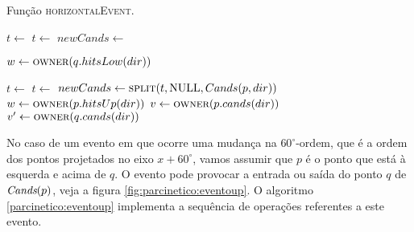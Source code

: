 \begin{algorithm}[h]
    \caption{Função \textsc{horizontalEvent}.}
    \label{parcinetico:eventohorizontal}
\begin{algorithmic}[1]
            \State $t \leftarrow$ 
                \State $t \leftarrow$ 
            \EndIf
            \State $newCands \leftarrow$ 
            \State {}
            \State {}
                \State {}
            \EndIf

            \State $w \leftarrow \Call{owner}{q.hitsLow(dir)}$

                \State {}
            \EndIf

            \State {}
        \Else
                \State $t \leftarrow$ 
                    \State $t \leftarrow$ 
                \EndIf
                \State $newCands \leftarrow \Call{split}{t, \Null, Cands(p,
                dir)}$
                \State {}
                \State {}
                    \State {}
                \EndIf
                \State $w \leftarrow \Call{owner}{p.hitsUp(dir)}$
                    \State {}
                \EndIf
                \State {}
            \EndIf
        \EndIf
        \State $v \leftarrow \Call{owner}{p.cands(dir)}$
        \State $v' \leftarrow \Call{owner}{q.cands(dir)}$
            \State {}
        \EndIf
    \EndFunction
\end{algorithmic}
\end{algorithm}

No caso de um evento em que ocorre uma mudança na $60^\circ$-ordem,
que é a ordem dos pontos projetados no eixo $x + 60^\circ$, vamos
assumir que $p$ é o ponto que está à esquerda e acima de $q$. O
evento pode provocar a entrada ou saída do ponto $q$ de $\textit{Cands}(p)$,
veja a figura \ref{fig:parcinetico:eventoup}. O algoritmo
\ref{parcinetico:eventoup} implementa a sequência de operações
referentes a este evento.

